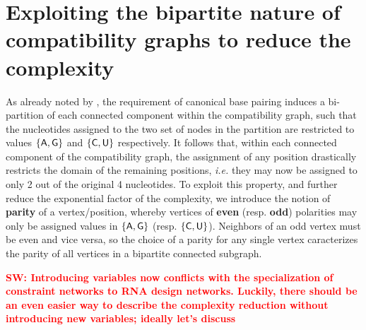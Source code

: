 \documentclass{bioinfo}
\newcommand{\Def}[1]{{\bfseries #1}}
\newcommand{\Nuc}[1]{{\sf #1}}
\newcommand{\Ab}{\Nuc{A}}
\newcommand{\Cb}{\Nuc{C}}
\newcommand{\Gb}{\Nuc{G}}
\newcommand{\Ub}{\Nuc{U}}
\begin{document}
\section{Exploiting the bipartite nature of compatibility graphs to reduce the complexity}\label{sec:improvedComplexity}

As already noted by \citet{Flamm2001}, the
requirement of canonical base pairing induces a bi-partition of each connected
component within the compatibility graph, such that the nucleotides assigned to the two set of nodes in the partition are 
restricted to values $\{\Ab,\Gb\}$ and $\{\Cb,\Ub\}$ respectively. It follows that, within each connected component of the compatibility graph, the assignment of any position drastically restricts the domain of the remaining positions, \emph{i.e.} they may now be assigned to only 2 out of the original 4 nucleotides.
\newcommand{\Parity}[1]{p_{#1}}
To exploit this property, and further reduce the exponential factor of the complexity, we introduce the notion of \Def{parity} of a vertex/position, whereby vertices of \Def{even} (resp. \Def{odd}) polarities may only be assigned values in $\{\Ab,\Gb\}$ (resp. $\{\Cb,\Ub\}$). Neighbors of an odd vertex must be even and vice versa, so the choice of a parity for any single vertex caracterizes the parity of all vertices in a bipartite connected subgraph. 

\textcolor{red}{\textbf{SW: Introducing variables now conflicts with
    the specialization of constraint networks to RNA design
    networks. Luckily, there should be an even easier way to describe
    the complexity reduction without introducing new variables; ideally let's discuss}}
\end{document}
